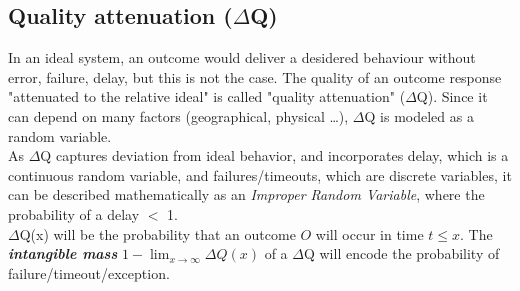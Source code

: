 \subsection{Quality attenuation ($\Delta$Q)}
        In an ideal system, an outcome would deliver a desidered behaviour without error, failure, delay, but this is not the case. The quality of an outcome response "attenuated to the relative ideal" is called "quality attenuation" ($\Delta$Q). Since it can depend on many factors (geographical, physical \dots), $\Delta$Q is modeled as a random variable. \\
    As $\Delta$Q captures deviation from ideal behavior, and incorporates delay, which is a continuous random variable, and failures/timeouts, which are discrete variables, it can be described mathematically as an \textit{Improper Random Variable}, where the probability of a delay $<$ 1. \\
    $\Delta$Q(x) will be the probability that an outcome $O$ will occur in time $t \le x$. The \textbf{\textit{intangible mass}} $1 - \lim_{x\to\infty}\Delta Q(x)$ of a $\Delta$Q will encode the probability of failure/timeout/exception.
    
